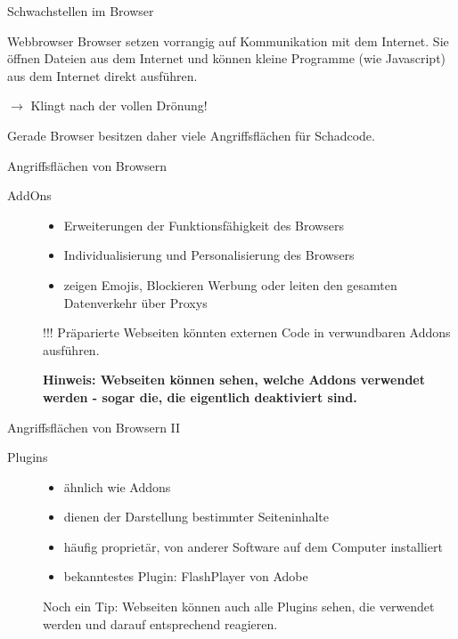 \documentclass[hyperref={colorlinks,linkcolor=white}, utf8]{beamer}
\begin{document}
	\begin{frame}{Schwachstellen im Browser}
		\begin{block}{Webbrowser}
			Browser setzen vorrangig auf Kommunikation mit dem Internet. Sie öffnen Dateien aus dem Internet und können kleine Programme (wie Javascript) aus dem Internet direkt ausführen.
		\end{block}
		
		\alert{ $\rightarrow$ Klingt nach der vollen Drönung!}
		
		Gerade Browser besitzen daher viele Angriffsflächen für Schadcode. 		
	\end{frame}

	\begin{frame}{Angriffsflächen von Browsern}
		\begin{description}
			\item[AddOns] {
				\begin{itemize}
					\item Erweiterungen der Funktionsfähigkeit des Browsers
					\item Individualisierung und Personalisierung des Browsers
					\item zeigen Emojis, Blockieren Werbung oder leiten den gesamten Datenverkehr über Proxys
				\end{itemize}
			
				\begin{alertblock}{!!!}
					Präparierte Webseiten könnten externen Code in verwundbaren Addons ausführen. 
					
					\textbf{Hinweis: Webseiten können sehen, welche Addons verwendet werden - sogar die, die eigentlich deaktiviert sind.}
				\end{alertblock}
			}
		\end{description}
	\end{frame}

	\begin{frame}{Angriffsflächen von Browsern II}
		\begin{description}
			\item[Plugins] {
				\begin{itemize}
					\item ähnlich wie Addons
					\item dienen der Darstellung bestimmter Seiteninhalte
					\item häufig proprietär, von anderer Software auf dem Computer installiert
					\item bekanntestes Plugin: FlashPlayer von Adobe					
				\end{itemize}
			
			\begin{alertblock}{Noch ein Tip:}
				Webseiten können auch alle Plugins sehen, die verwendet werden und darauf entsprechend reagieren.
			\end{alertblock}
		}
		\end{description}
	\end{frame}
	
\end{document}
